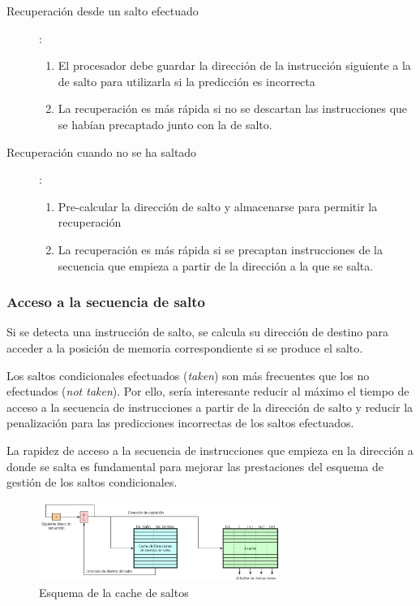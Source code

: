 \documentclass[10pt,a4paper,spanish]{report}
\begin{document}
\begin{description}
    \item[Recuperación desde un salto efectuado]:
    \begin{enumerate}[\color{azul}{$\heartsuit$}]
        \item El procesador debe guardar la dirección de la instrucción siguiente a la de salto para utilizarla si la predicción es incorrecta
        \item La recuperación es más rápida si no se descartan las instrucciones que se habían precaptado junto con la de salto.
    \end{enumerate}
    \item[Recuperación cuando no se ha saltado]:
    \begin{enumerate}[\color{azul}{$\heartsuit$}]
        \item Pre-calcular la dirección de salto y almacenarse para permitir la recuperación
        \item La recuperación es más rápida si se precaptan instrucciones de la secuencia que empieza a partir de la dirección a la que se salta.
    \end{enumerate}
\end{description}

\textcolor{azul}{\subsubsection{Acceso a la secuencia de salto}}
Si se detecta una instrucción de salto, se calcula su dirección de destino para acceder a la posición de memoria correspondiente si se produce el salto.

Los saltos condicionales efectuados (\textit{\textcolor{azul}{taken}}) son más frecuentes que los no efectuados (\textit{\textcolor{azul}{not taken}}). Por ello, sería interesante reducir al máximo el tiempo de acceso a la secuencia de instrucciones a partir de la dirección de salto y reducir la penalización para las predicciones incorrectas de los saltos efectuados.

La rapidez de acceso a la secuencia de instrucciones que empieza en la dirección a donde se salta es fundamental para mejorar las prestaciones del esquema de gestión de los saltos condicionales.

\begin{figure}[!h]
\centering
\includegraphics[width=0.7\textwidth]{107}
\caption{Esquema de la cache de saltos}
\label{cache_saltos}
\end{figure}
\end{document}
